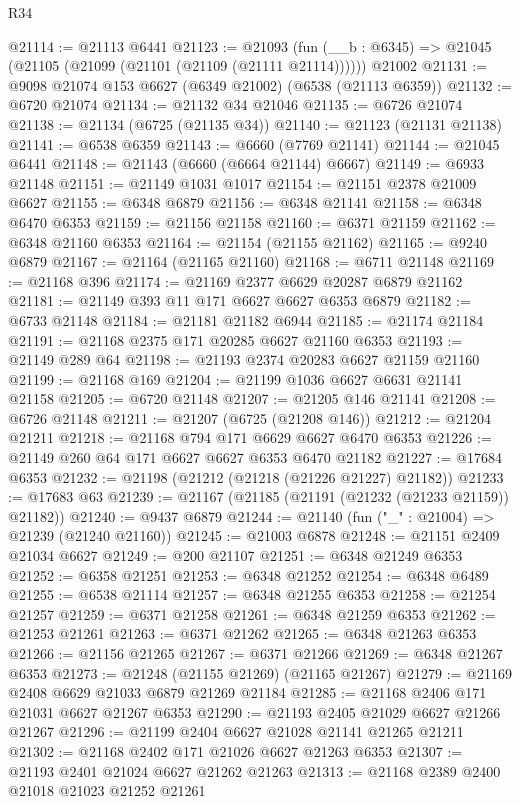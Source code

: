 \begin{lexlean}{R34}
\begin{coremodule}
@21114 := @21113 @6441
@21123 := @21093
    (fun (__b : @6345) => @21045 (@21105 (@21099 (@21101 (@21109 (@21111 @21114))))))
    @21002
@21131 := @9098 @21074 @153 @6627 (@6349 @21002) (@6538 (@21113 @6359))
@21132 := @6720 @21074
@21134 := @21132 @34 @21046
@21135 := @6726 @21074
@21138 := @21134 (@6725 (@21135 @34))
@21140 := @21123 (@21131 @21138)
@21141 := @6538 @6359
@21143 := @6660 (@7769 @21141)
@21144 := @21045 @6441
@21148 := @21143 (@6660 (@6664 @21144) @6667)
@21149 := @6933 @21148
@21151 := @21149 @1031 @1017
@21154 := @21151 @2378 @21009 @6627
@21155 := @6348 @6879
@21156 := @6348 @21141
@21158 := @6348 @6470 @6353
@21159 := @21156 @21158
@21160 := @6371 @21159
@21162 := @6348 @21160 @6353
@21164 := @21154 (@21155 @21162)
@21165 := @9240 @6879
@21167 := @21164 (@21165 @21160)
@21168 := @6711 @21148
@21169 := @21168 @396
@21174 := @21169 @2377 @6629 @20287 @6879 @21162
@21181 := @21149 @393 @11 @171 @6627 @6627 @6353 @6879
@21182 := @6733 @21148
@21184 := @21181 @21182 @6944
@21185 := @21174 @21184
@21191 := @21168 @2375 @171 @20285 @6627 @21160 @6353
@21193 := @21149 @289 @64
@21198 := @21193 @2374 @20283 @6627 @21159 @21160
@21199 := @21168 @169
@21204 := @21199 @1036 @6627 @6631 @21141 @21158
@21205 := @6720 @21148
@21207 := @21205 @146 @21141
@21208 := @6726 @21148
@21211 := @21207 (@6725 (@21208 @146))
@21212 := @21204 @21211
@21218 := @21168 @794 @171 @6629 @6627 @6470 @6353
@21226 := @21149 @260 @64 @171 @6627 @6627 @6353 @6470 @21182
@21227 := @17684 @6353
@21232 := @21198 (@21212 (@21218 (@21226 @21227) @21182))
@21233 := @17683 @63
@21239 := @21167 (@21185 (@21191 (@21232 (@21233 @21159)) @21182))
@21240 := @9437 @6879
@21244 := @21140 (fun ("_" : @21004) => @21239 (@21240 @21160))
@21245 := @21003 @6878
@21248 := @21151 @2409 @21034 @6627
@21249 := @200 @21107
@21251 := @6348 @21249 @6353
@21252 := @6358 @21251
@21253 := @6348 @21252
@21254 := @6348 @6489
@21255 := @6538 @21114
@21257 := @6348 @21255 @6353
@21258 := @21254 @21257
@21259 := @6371 @21258
@21261 := @6348 @21259 @6353
@21262 := @21253 @21261
@21263 := @6371 @21262
@21265 := @6348 @21263 @6353
@21266 := @21156 @21265
@21267 := @6371 @21266
@21269 := @6348 @21267 @6353
@21273 := @21248 (@21155 @21269) (@21165 @21267)
@21279 := @21169 @2408 @6629 @21033 @6879 @21269 @21184
@21285 := @21168 @2406 @171 @21031 @6627 @21267 @6353
@21290 := @21193 @2405 @21029 @6627 @21266 @21267
@21296 := @21199 @2404 @6627 @21028 @21141 @21265 @21211
@21302 := @21168 @2402 @171 @21026 @6627 @21263 @6353
@21307 := @21193 @2401 @21024 @6627 @21262 @21263
@21313 := @21168 @2389 @2400 @21018 @21023 @21252 @21261

\end{coremodule}
\end{lexlean}
